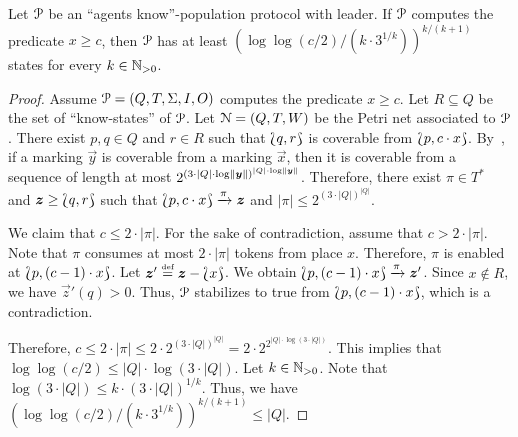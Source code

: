 \begin{theorem}
  Let $\mathcal{P}$ be an ``agents know''-population protocol with leader. If
  $\mathcal{P}$ computes the predicate $x \geq c$, then $\mathcal{P}$ has at least
  $(\log \log(c / 2) / (k \cdot 3^{1 / k}))^{k / (k + 1)}$ states for
  every $k \in \mathbb{N}_{>0}$. 
\end{theorem}

\begin{proof}
  Assume $\mathcal{P} = (Q, T, \Sigma, I, O)$ computes the predicate $x \geq
  c$. Let $R \subseteq Q$ be the set of ``know-states'' of $\mathcal{P}$. Let
  $\mathcal{N} = (Q, T, W)$ be the Petri net associated to $\mathcal{P}$. There exist
  $p, q \in Q$ and $r \in R$ such that $\Lbag q, r\Rbag$ is coverable
  from $\Lbag p, c \cdot x\Rbag$. By~\cite{Rac78}, if a marking
  $\vec{y}$ is coverable from a marking $\vec{x}$, then it is
  coverable from a sequence of length at most $2^{{(3 \cdot |Q| \cdot
      \log \lVert\bm{y}\rVert)}^{|Q| \cdot \log
      \lVert\bm{y}\rVert}}$. Therefore, there exist $\pi \in T^*$ and
  $\bm{z} \geq \Lbag q, r\Rbag$ such that $\Lbag p, c \cdot x\Rbag
  \xrightarrow{\pi} \bm{z}$ and $|\pi| \leq 2^{(3 \cdot |Q|)^{|Q|}}$.

  We claim that $c \leq 2 \cdot |\pi|$. For the sake of contradiction,
  assume that $c > 2 \cdot |\pi|$. Note that $\pi$ consumes at most $2
  \cdot |\pi|$ tokens from place $x$. Therefore, $\pi$ is enabled at
  $\Lbag p, (c - 1) \cdot x\Rbag$. Let $\bm{z}' \stackrel{\scriptscriptstyle\text{def}}{=} \bm{z} -
  \Lbag x\Rbag$. We obtain $\Lbag p, (c-1) \cdot x\Rbag \xrightarrow{\pi}
  \bm{z}'$. Since $x \not\in R$, we have $\vec{z}'(q) > 0$. Thus,
  $\mathcal{P}$ stabilizes to true from $\Lbag p, (c-1) \cdot x\Rbag$, which
  is a contradiction.

  Therefore, $c \leq 2 \cdot |\pi| \leq 2 \cdot 2^{(3 \cdot
    |Q|)^{|Q|}} = 2 \cdot 2^{2^{|Q| \cdot \log(3 \cdot |Q|)}}$. This
  implies that $\log \log (c / 2) \leq |Q| \cdot \log(3 \cdot
  |Q|)$. Let $k \in \mathbb{N}_{>0}$. Note that $\log(3 \cdot |Q|) \leq k
  \cdot (3 \cdot |Q|)^{1 / k}$. Thus, we have $(\log \log(c / 2) / (k
  \cdot 3^{1 / k}))^{k / (k + 1)} \leq |Q|$.
\end{proof}


